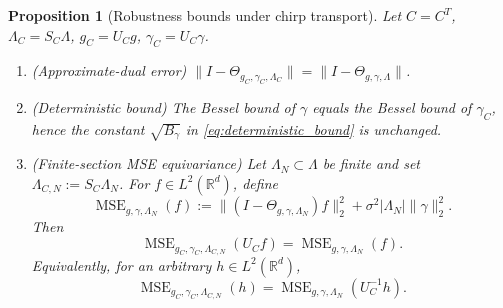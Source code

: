 \documentclass[final,1p,times,authoryear]{elsarticle}
\newtheorem{proposition}[theorem]{Proposition}
\theoremstyle{definition}
\newcommand{\R}{\mathbb{R}}
\newcommand{\1}{\mathbf{1}}
\begin{document}
\begin{proposition}[Robustness bounds under chirp transport]\label{prop:robustness_transport}
Let $C=C^T$, $\Lambda_C=S_C\Lambda$, $g_C=U_C g$, $\gamma_C=U_C\gamma$.
\begin{enumerate}[label=\textup{(\roman*)}]
\item (Approximate-dual error) $\|I-\Theta_{g_C,\gamma_C,\Lambda_C}\|=\|I-\Theta_{g,\gamma,\Lambda}\|$.
\item (Deterministic bound) The Bessel bound of $\gamma$ equals the Bessel bound of $\gamma_C$, hence
the constant $\sqrt{B_\gamma}$ in \eqref{eq:deterministic_bound} is unchanged.
\item {(Finite-section MSE equivariance) Let $\Lambda_N\subset\Lambda$ be finite and set
$\Lambda_{C,N}:=S_C\Lambda_N$. For $f\in L^2(\R^d)$, define
$$
\operatorname{MSE}_{g,\gamma,\Lambda_N}(f)
:=
\|(I-\Theta_{g,\gamma,\Lambda_N})f\|_2^2
+
\sigma^2|\Lambda_N|\|\gamma\|_2^2 .
$$
Then
$$
\operatorname{MSE}_{g_C,\gamma_C,\Lambda_{C,N}}(U_Cf)
=
\operatorname{MSE}_{g,\gamma,\Lambda_N}(f).
$$
Equivalently, for an arbitrary $h\in L^2(\R^d)$,
$$
\operatorname{MSE}_{g_C,\gamma_C,\Lambda_{C,N}}(h)
=
\operatorname{MSE}_{g,\gamma,\Lambda_N}(U_C^{-1}h).
$$}
\end{enumerate}
\end{proposition}
\end{document}
